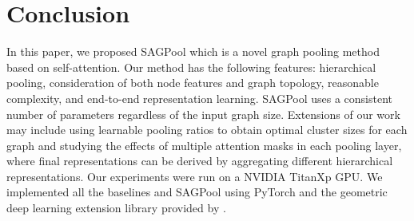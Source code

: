 \documentclass{article}
\begin{document}
\section{Conclusion}
\label{conclusion}
In this paper, we proposed SAGPool which is a novel graph pooling method based on self-attention. Our method has the following features: hierarchical pooling, consideration of both node features and graph topology, reasonable complexity, and end-to-end representation learning. SAGPool uses a consistent number of parameters regardless of the input graph size. 
Extensions of our work may include using learnable pooling ratios to obtain optimal cluster sizes for each graph and studying the effects of multiple attention masks in each pooling layer, where final representations can be derived by aggregating different hierarchical representations.
Our experiments were run on a NVIDIA TitanXp GPU. We implemented all the baselines and SAGPool using PyTorch \cite{paszke2017automatic} and the geometric deep learning extension library provided by \citeauthor{Fey/etal/2018}.
%
\end{document}
